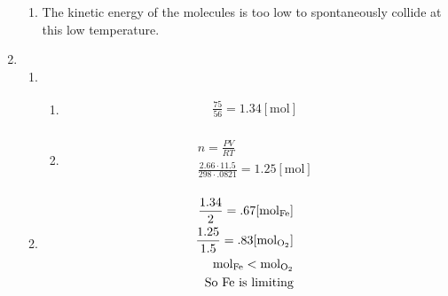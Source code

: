 \documentclass[12pt]{article}
\begin{document}
\begin{enumerate}
\begin{enumerate}
      \item The kinetic energy of the molecules is too low to spontaneously collide at this low temperature.

    \end{enumerate}

  \item 

    \begin{enumerate}

      \item 

        \begin{enumerate}

          \item 

            \begin{equation}
              \begin{split}
                \frac{75}{56}=1.34[\si{\mole}]\\
              \end{split}
              \label{3}
            \end{equation}

          \item 

            \begin{equation}
              \begin{split}
                n=\frac{PV}{RT}\\
                \frac{2.66\cdot11.5}{298\cdot.0821}=1.25[\si{\mole}]\\
              \end{split}
              \label{4}
            \end{equation}

        \end{enumerate}

      \item 

        \begin{equation}
          \begin{split}
            \frac{1.34}{2}=.67[\si{\mole}_{\ce{Fe}}]\\
            \frac{1.25}{1.5}=.83[\si{\mole}_{\ce{O2}}]\\
            \si{\mole}_{\ce{Fe}}<\si{\mole}_{\ce{O2}}\\
            \text{So \ce{Fe} is limiting}
          \end{split}
          \label{5}
        \end{equation}
      

\end{enumerate}
\end{enumerate}
\end{document}
